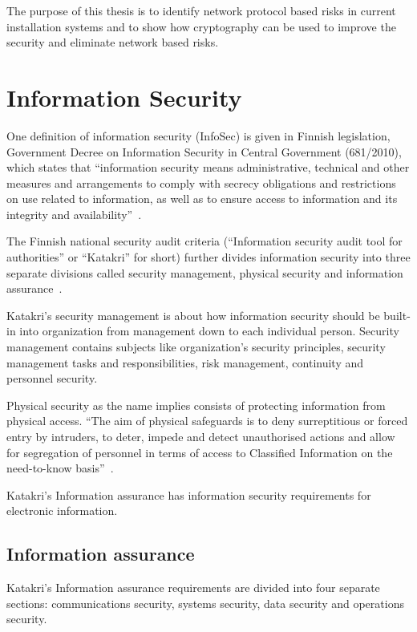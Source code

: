 The purpose of this thesis is to identify network protocol based risks
in current installation systems and to show how cryptography can be
used to improve the security and eliminate network based risks.


\section{Information Security}

One definition of information security (InfoSec) is given in Finnish
legislation, Government Decree on Information Security in Central
Government (681/2010), which states that ``information security means
administrative, technical and other measures and arrangements to
comply with secrecy obligations and restrictions on use related to
information, as well as to ensure access to information and its
integrity and availability''~\cite{finlex-infosec-in-gov}.

The Finnish national security audit criteria (``Information security
audit tool for authorities'' or ``Katakri'' for short) further divides
information security into three separate divisions called security
management, physical security and information
assurance~\cite{katakri}.

Katakri's security management is about how information security should
be built-in into organization from management down to each individual
person. Security management contains subjects like organization's
security principles, security management tasks and responsibilities,
risk management, continuity and personnel security.

Physical security as the name implies consists of protecting
information from physical access. ``The aim of physical safeguards is
to deny surreptitious or forced entry by intruders, to deter, impede
and detect unauthorised actions and allow for segregation of personnel
in terms of access to Classified Information on the need-to-know
basis''~\cite{katakri}.

Katakri's Information assurance has information security requirements
for electronic information.


\subsection{Information assurance}

Katakri's Information assurance requirements are divided into four
separate sections: communications security, systems security, data
security and operations security.

